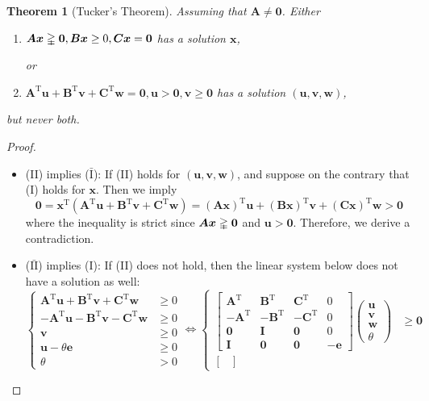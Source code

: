 \documentclass[12pt]{article}
\newcommand{\trans}{^{\mathrm T}}
\newtheorem{theorem}{Theorem}[section]
\begin{document}
\begin{theorem}[Tucker's Theorem]
Assuming that $\bm A\ne\bm0$.
Either
\begin{enumerate}
\item[(I)]
$\bm A\bm x\gvertneqq\bm 0,\bm B\bm x\ge0,\bm C\bm x=\bm0$ has a solution $\bm x$,

or
\item[(II)]
$\bm A\trans\bm u+\bm B\trans\bm v+\bm C\trans\bm w=\bm0,\bm u>\bm0,\bm v\ge\bm0$ has a solution $(\bm u,\bm v,\bm w)$,
\end{enumerate}
but never both.
\end{theorem}
\begin{proof}
\begin{itemize}
\item
(II) implies ($\bar{\text{I}}$):
If (II) holds for $(\bm u,\bm v,\bm w)$, and suppose on the contrary that (I) holds for $\bm x$. Then we imply
\[
\bm0=\bm x\trans(\bm A\trans\bm u+\bm B\trans\bm v+\bm C\trans\bm w)
=
(\bm A\bm x)\trans\bm u+(\bm B\bm x)\trans\bm v+(\bm C\bm x)\trans\bm w>\bm0
\]
where the inequality is strict 
since $\bm A\bm x\gvertneqq\bm0$ and $\bm u>\bm0$. Therefore, we derive a contradiction.
\item
($\bar{\text{II}}$) implies (I):
If (II) does not hold, then the linear system below does not have a solution as well:
\[
\left\{
\begin{aligned}
\bm A\trans\bm u+\bm B\trans\bm v+\bm C\trans\bm w&\ge0\\
-\bm A\trans\bm u-\bm B\trans\bm v-\bm C\trans\bm w&\ge0\\
\bm v&\ge0\\
\bm u-\theta\bm e&\ge0\\
\theta&>0
\end{aligned}
\right.
\Longleftrightarrow
\left\{
\begin{aligned}
\begin{bmatrix}
\bm A\trans&\bm B\trans&\bm C\trans&0\\
-\bm A\trans&-\bm B\trans&-\bm C\trans&0\\
\bm0&\bm I&\bm0&0\\
\bm I&\bm0&\bm0&-\bm e
\end{bmatrix}\begin{pmatrix}
\bm u\\\bm v\\\bm w\\\theta
\end{pmatrix}&\ge\bm0\\
\begin{bmatrix}

\end{bmatrix}
\end{aligned}\]
\end{itemize}
\end{proof}
\end{document}
